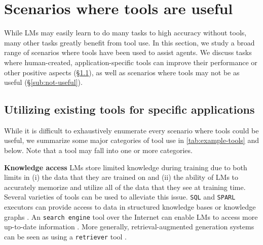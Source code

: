 \section{Scenarios where tools are useful}
\label{sec:scenarios}

While LMs may easily learn to do many tasks to high accuracy without tools, many other tasks greatly benefit from tool use.
In this section, we study a broad range of scenarios where tools have been used to assist agents. We discuss tasks where human-created, application-specific tools can improve their performance or other positive aspects (\S\ref{sub:app-spec}), as well as scenarios where tools may not be as useful (\S\ref{sub:not-useful}). 



\subsection{Utilizing existing tools for specific applications}
\label{sub:app-spec}

While it is difficult to exhaustively enumerate every scenario where tools could be useful, we summarize some major categories of tool use in \autoref{tab:example-tools} and below.
Note that a tool may fall into one or more categories.


\noindent \textbf{ Knowledge access} \quad
LMs store limited knowledge during training due to both limits in (i) the data that they are trained on and (ii) the ability of LMs to accurately memorize and utilize all of the data that they see at training time.
Several varieties of tools can be used to alleviate this issue.
\texttt{SQL} and \texttt{SPARL} executors can provide access to data in structured knowledge bases \citep{thoppilan2022lamda,parisi2022talm,hao2023toolkengpt} or knowledge graphs \citep{zhuang2023toolqa}.
An \texttt{search engine} tool  over the Internet \citep{yao2023react,schick2023toolformer,paranjape2023art} can enable LMs to access more up-to-date information \citep{komeili-etal-2022-internet,lazaridou2022internetaugmented}.
More generally, retrieval-augmented generation systems \citep{asai2023retrieval} can be seen as using a \texttt{retriever} tool \citep{mialon2023augmented}.


